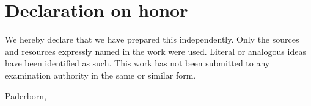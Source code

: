 
\section*{Declaration on honor}


We hereby declare that we have prepared this \dokumententyp{} independently. Only the sources and resources expressly named in the work were used. Literal or analogous ideas have been identified as such. This work has not been submitted to any examination authority in the same or similar form.
\vspace{20mm}

Paderborn, \abgabedatum
\vspace{10mm}

\underline{\hspace{8cm}}\\\dokumentenautor